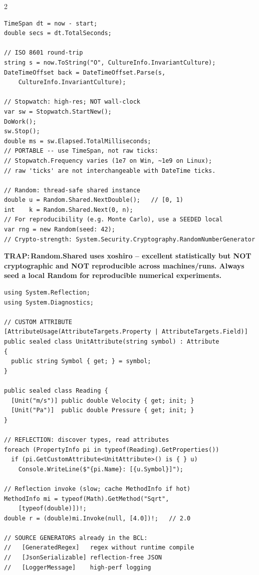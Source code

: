 \documentclass[9pt,a4paper]{extarticle}
\newenvironment{card}[3][acBlue]{%
  \begin{tcolorbox}[
    enhanced, colback=#2, colframe=bdCard,
    coltitle=black, colbacktitle=#2!70!bgHdr,
    fonttitle=\bfseries\fontsize{6.16pt}{7.48pt}\selectfont\MakeUppercase,
    title={#3},
    left=3pt, right=2pt, top=1.4pt, bottom=1.8pt,
    toptitle=1pt, bottomtitle=1pt,
    boxrule=0.4pt,
    borderline west={3pt}{0pt}{#1},
    arc=2pt, before skip=0pt, after skip=1.6mm,
    breakable, toprule at break=0pt, bottomrule at break=0pt,
  ]}{\end{tcolorbox}}
\newcommand{\code}[1]{{\ttfamily\bfseries #1}}
\newcommand{\trap}[1]{\par\noindent
  \begin{minipage}{\linewidth}%
  {\fontsize{5.6pt}{6.8pt}\selectfont\color{trap}\bfseries TRAP:\,#1}%
  \end{minipage}\par}
\begin{document}
\begin{multicols}{2}
\begin{card}[acAmber]{bgAmber}{Dates, Times, Random \& Stopwatch}
\begin{lstlisting}[style=cs]
TimeSpan dt = now - start;
double secs = dt.TotalSeconds;

// ISO 8601 round-trip
string s = now.ToString("O", CultureInfo.InvariantCulture);
DateTimeOffset back = DateTimeOffset.Parse(s,
    CultureInfo.InvariantCulture);

// Stopwatch: high-res; NOT wall-clock
var sw = Stopwatch.StartNew();
DoWork();
sw.Stop();
double ms = sw.Elapsed.TotalMilliseconds;
// PORTABLE -- use TimeSpan, not raw ticks:
// Stopwatch.Frequency varies (1e7 on Win, ~1e9 on Linux);
// raw 'ticks' are not interchangeable with DateTime ticks.

// Random: thread-safe shared instance
double u = Random.Shared.NextDouble();   // [0, 1)
int    k = Random.Shared.Next(0, n);
// For reproducibility (e.g. Monte Carlo), use a SEEDED local
var rng = new Random(seed: 42);
// Crypto-strength: System.Security.Cryptography.RandomNumberGenerator
\end{lstlisting}
\trap{\code{Random.Shared} uses xoshiro -- excellent statistically but
NOT cryptographic and NOT reproducible across machines/runs. Always
seed a local \code{Random} for reproducible numerical experiments.}
\end{card}

\begin{card}[acRed]{bgRed}{Attributes, Reflection \& Source Gen}
\begin{lstlisting}[style=cs]
using System.Reflection;
using System.Diagnostics;

// CUSTOM ATTRIBUTE
[AttributeUsage(AttributeTargets.Property | AttributeTargets.Field)]
public sealed class UnitAttribute(string symbol) : Attribute
{
  public string Symbol { get; } = symbol;
}

public sealed class Reading {
  [Unit("m/s")] public double Velocity { get; init; }
  [Unit("Pa")]  public double Pressure { get; init; }
}

// REFLECTION: discover types, read attributes
foreach (PropertyInfo pi in typeof(Reading).GetProperties())
  if (pi.GetCustomAttribute<UnitAttribute>() is { } u)
    Console.WriteLine($"{pi.Name}: [{u.Symbol}]");

// Reflection invoke (slow; cache MethodInfo if hot)
MethodInfo mi = typeof(Math).GetMethod("Sqrt",
    [typeof(double)])!;
double r = (double)mi.Invoke(null, [4.0])!;   // 2.0

// SOURCE GENERATORS already in the BCL:
//   [GeneratedRegex]   regex without runtime compile
//   [JsonSerializable] reflection-free JSON
//   [LoggerMessage]    high-perf logging


\end{lstlisting}
\end{card}
\end{multicols}
\end{document}
